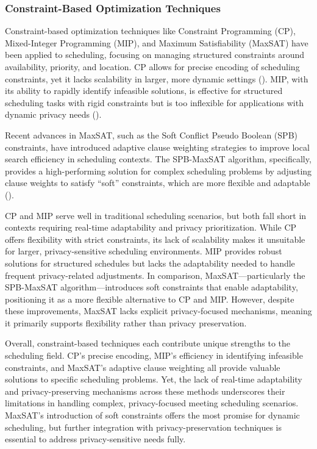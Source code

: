 \begin{spacing}{1.0}
    \subsubsection{Constraint-Based Optimization Techniques}
    \indent \indent Constraint-based optimization techniques like Constraint Programming (CP), Mixed-Integer Programming (MIP), and Maximum Satisfiability (MaxSAT) have been applied to scheduling, focusing on managing structured constraints around availability, priority, and location. CP allows for precise encoding of scheduling constraints, yet it lacks scalability in larger, more dynamic settings (\cite{bofill2022}). MIP, with its ability to rapidly identify infeasible solutions, is effective for structured scheduling tasks with rigid constraints but is too inflexible for applications with dynamic privacy needs (\cite{peteghem2010}). 
    \par Recent advances in MaxSAT, such as the Soft Conflict Pseudo Boolean (SPB) constraints, have introduced adaptive clause weighting strategies to improve local search efficiency in scheduling contexts. The SPB-MaxSAT algorithm, specifically, provides a high-performing solution for complex scheduling problems by adjusting clause weights to satisfy “soft” constraints, which are more flexible and adaptable (\cite{jiongzhi2024}). 
    \par CP and MIP serve well in traditional scheduling scenarios, but both fall short in contexts requiring real-time adaptability and privacy prioritization. While CP offers flexibility with strict constraints, its lack of scalability makes it unsuitable for larger, privacy-sensitive scheduling environments. MIP provides robust solutions for structured schedules but lacks the adaptability needed to handle frequent privacy-related adjustments. In comparison, MaxSAT—particularly the SPB-MaxSAT algorithm—introduces soft constraints that enable adaptability, positioning it as a more flexible alternative to CP and MIP. However, despite these improvements, MaxSAT lacks explicit privacy-focused mechanisms, meaning it primarily supports flexibility rather than privacy preservation.
    \par Overall, constraint-based techniques each contribute unique strengths to the scheduling field. CP’s precise encoding, MIP’s efficiency in identifying infeasible constraints, and MaxSAT’s adaptive clause weighting all provide valuable solutions to specific scheduling problems. Yet, the lack of real-time adaptability and privacy-preserving mechanisms across these methods underscores their limitations in handling complex, privacy-focused meeting scheduling scenarios. MaxSAT’s introduction of soft constraints offers the most promise for dynamic scheduling, but further integration with privacy-preservation techniques is essential to address privacy-sensitive needs fully.

\end{spacing}
